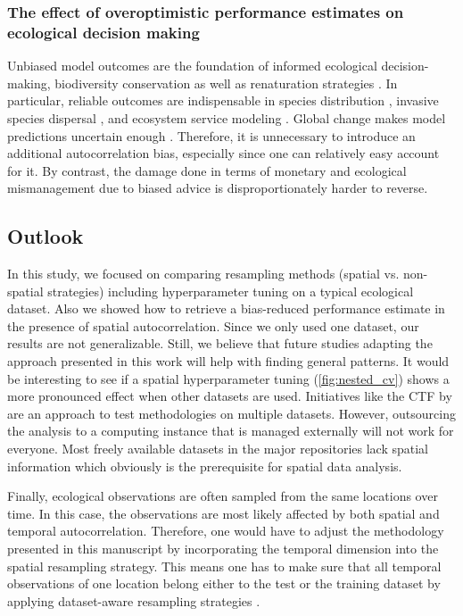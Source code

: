 \documentclass[review]{elsarticle}
\begin{document}
\subsubsection{The effect of overoptimistic performance estimates on ecological decision making}
\noindent Unbiased model outcomes are the foundation of informed ecological decision-making, biodiversity conservation as well as renaturation strategies \citep{muenchowReviewEcologicalGradient2018}.
In particular, reliable outcomes are indispensable in species distribution \citep{loehleDisequilibriumRelaxationTimes2018}, invasive species dispersal \citep{srivastavaMappingInvasionPotential2018}, and ecosystem service modeling \citep{watanabeDynamicEmergyAccounting2014}.
Global change makes model predictions uncertain enough \citep{ipccSummaryPolicymakers2013}.
Therefore, it is unnecessary to introduce an additional autocorrelation bias, especially since one can relatively easy account for it.
By contrast, the damage done in terms of monetary and ecological mismanagement due to biased advice is disproportionately harder to reverse.

\subsection{Outlook}

In this study, we focused on comparing resampling methods (spatial vs. non-spatial strategies) including hyperparameter tuning on a typical ecological dataset.
Also we showed how to retrieve a bias-reduced performance estimate in the presence of spatial autocorrelation.
Since we only used one dataset, our results are not generalizable.
Still, we believe that future studies adapting the approach presented in this work will help with finding general patterns.
It would be interesting to see if a spatial hyperparameter tuning (\autoref{fig:nested_cv}) shows a more pronounced effect when other datasets are used.
Initiatives like the \ac{CTF} by \cite{wikleCommonTaskFramework2017} are an approach to test methodologies on multiple datasets.
However, outsourcing the analysis to a computing instance that is managed externally will not work for everyone.
Most freely available datasets in the major repositories \citep{olsonPMLBLargeBenchmark2017, vanschorenOpenMLNetworkedScience2014} lack spatial information which obviously is the prerequisite for spatial data analysis.

Finally, ecological observations are often sampled from the same locations over time.
In this case, the observations are most likely affected by both spatial and temporal autocorrelation.
Therefore, one would have to adjust the methodology presented in this manuscript by incorporating the temporal dimension into the spatial resampling strategy.
This means one has to make sure that all temporal observations of one location belong either to the test or the training dataset by applying dataset-aware resampling strategies \citep{Meyer2018}.
\end{document}
